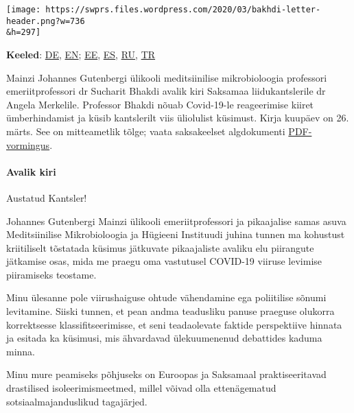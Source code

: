 \texttt{[image: https://swprs.files.wordpress.com/2020/03/bakhdi-letter-header.png?w=736\\\&h=297]}

\textbf{Keeled}:
\href{https://swprs.org/offener-brief-von-professor-sucharit-bhakdi-an-bundeskanzlerin-dr-angela-merkel/}{DE},
\href{https://swprs.org/open-letter-from-professor-sucharit-bhakdi-to-german-chancellor-dr-angela-merkel/}{EN};
\href{https://swprs.org/professor-sucharit-bhakdi-avalik-kiri-angela-merkelile/}{EE},
\href{http://piensachile.com/2020/03/carta-abierta-a-angela-merkel/}{ES},
\href{https://swprs.org/\%d0\%be\%d1\%82\%d0\%ba\%d1\%80\%d1\%8b\%d1\%82\%d0\%be\%d0\%b5-\%d0\%bf\%d0\%b8\%d1\%81\%d1\%8c\%d0\%bc\%d0\%be-\%d0\%bf\%d1\%80\%d0\%be\%d1\%84\%d0\%b5\%d1\%81\%d1\%81\%d0\%be\%d1\%80\%d0\%b0-\%d1\%81\%d1\%83\%d1\%87\%d0\%b0\%d1\%80\%d0\%b8\%d1\%82\%d0\%b0/}{RU},
\href{https://swprs.org/prof-dr-sucharit-bhakdiden-basbakan-dr-angela-merkele-acik-mektup/}{TR}

Mainzi Johannes Gutenbergi ülikooli meditsiinilise mikrobioloogia
professori emeriitprofessori dr Sucharit Bhakdi avalik kiri Saksamaa
liidukantslerile dr Angela Merkelile. Professor Bhakdi nõuab Covid-19-le
reageerimise kiiret ümberhindamist ja küsib kantslerilt viis üliolulist
küsimust. Kirja kuupäev on 26. märts. See on mitteametlik tõlge; vaata
saksakeelset algdokumenti
\href{https://swprs.org/offener-brief-von-professor-sucharit-bhakdi-an-bundeskanzlerin-dr-angela-merkel/}{PDF-vormingus}.

\hypertarget{avalik-kiri}{%
\paragraph{Avalik kiri}\label{avalik-kiri}}

Austatud Kantsler!

Johannes Gutenbergi Mainzi ülikooli emeriitprofessori ja pikaajalise
samas asuva Meditsiinilise Mikrobioloogia ja Hügieeni Instituudi juhina
tunnen ma kohustust kriitiliselt tõstatada küsimus jätkuvate
pikaajaliste avaliku elu piirangute jätkamise osas, mida me praegu oma
vastutusel COVID-19 viiruse levimise piiramiseks teostame.

Minu ülesanne pole viirushaiguse ohtude vähendamine ega poliitilise
sõnumi levitamine. Siiski tunnen, et pean andma teadusliku panuse
praeguse olukorra korrektsesse klassifitseerimisse, et seni teadaolevate
faktide perspektiive hinnata ja esitada ka küsimusi, mis ähvardavad
ülekuumenenud debattides kaduma minna.

Minu mure peamiseks põhjuseks on Euroopas ja Saksamaal praktiseeritavad
drastilised isoleerimismeetmed, millel võivad olla ettenägematud
sotsiaalmajanduslikud tagajärjed.

